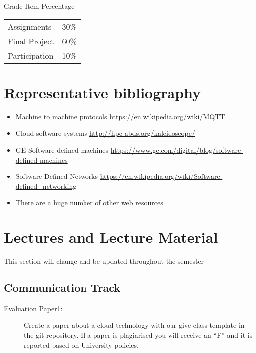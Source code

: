 Grade Item	Percentage
\begin{tabular}{lr}
Assignments	  & 30\% \\
Final Project	& 60\% \\
Participation	& 10\% \\
\end{tabular}



\section{Representative bibliography}

\begin{itemize}
\item	Machine to machine protocols \url{https://en.wikipedia.org/wiki/MQTT}
\item	Cloud software systems \url{http://hpc-abds.org/kaleidoscope/}
\item	GE Software defined machines \url{https://www.ge.com/digital/blog/software-defined-machines}
\item	Software Defined Networks \url{https://en.wikipedia.org/wiki/Software-defined_networking}
\item	There are a huge number of other web resources
\end{itemize}

\section{Lectures and Lecture Material}

\begin{WARNING}
This section will change and be updated throughout the semester
\end{WARNING}

\subsection{Communication Track}




\begin{description}
\item[Evaluation Paper1:] Create a paper about a cloud technology with our give
class template in the git repository. If a paper is plagiarised you
will receive an ``F'' and it is reported based on University
policies.
\end{description}


